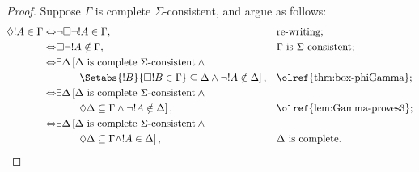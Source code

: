 \documentclass[../../../include/open-logic-section]{subfiles}
\begin{document}
\begin{proof}
Suppose $\Gamma$ is complete $\Sigma$-consistent, and argue as
follows:
\begin{align*}
  \Diamond!A \in \Gamma \Leftrightarrow &
  \lnot\Box\lnot !A \in \Gamma, && \text{re-writing}; \\
  \Leftrightarrow & \Box\lnot!A \notin \Gamma, && \Gamma
  \text{ is $\Sigma$-consistent}; \\ 
  \Leftrightarrow & \exists\Delta \left[ \Delta \text{ is
      complete $\Sigma$-consistent} {} \land {}\right.\\
    & \qquad \left.\Setabs{ !B }{ \Box !B \in \Gamma }
  \subseteq \Delta  \land \lnot!A \notin\Delta\right], &&
   \text{\olref{thm:box-phiGamma}}; \\
 \Leftrightarrow & \exists\Delta \left[ \Delta \text{ is
     complete $\Sigma$-consistent} \land {}\right.\\
   & \qquad \left.\Diamond\Delta \subseteq \Gamma \land  \lnot!A \notin\Delta\right], && 
   \text{\olref{lem:Gamma-proves3}}; \\
\Leftrightarrow & \exists\Delta \left[ \Delta \text{ is
    complete $\Sigma$-consistent} {} \land {}\right.\\
  & \qquad \left.\Diamond \Delta \subseteq \Gamma  \land !A \in\Delta\right], && \Delta \text{ is complete}. \qedhere  
\end{align*}
\end{proof}
\end{document}
